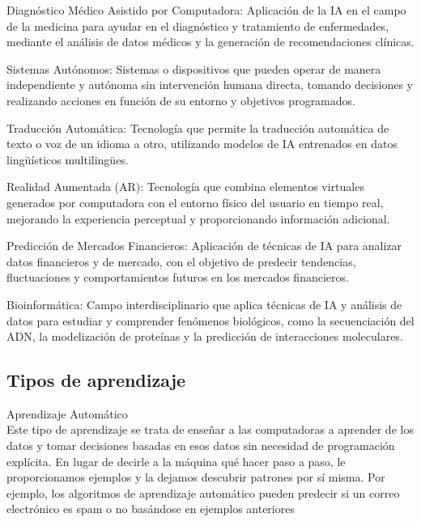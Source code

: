 \begin{myitemize}
    \item Diagnóstico Médico Asistido por Computadora: Aplicación de la IA en el 
    campo de la medicina para ayudar en el diagnóstico y tratamiento de 
    enfermedades, mediante el análisis de datos médicos y la generación de 
    recomendaciones clínicas.
    
    \item Sistemas Autónomos: Sistemas o dispositivos que pueden operar de manera 
    independiente y autónoma sin intervención humana directa, tomando 
    decisiones y realizando acciones en función de su entorno y objetivos programados.
    
    \item Traducción Automática: Tecnología que permite la traducción automática 
    de texto o voz de un idioma a otro, utilizando modelos de IA entrenados en 
    datos lingüísticos multilingües.
    
    \item Realidad Aumentada (AR): Tecnología que combina elementos virtuales 
    generados por computadora con el entorno físico del usuario en tiempo real, 
    mejorando la experiencia perceptual y proporcionando información adicional.
    
    \item Predicción de Mercados Financieros: Aplicación de técnicas de IA para analizar 
    datos financieros y de mercado, con el objetivo de predecir tendencias, 
    fluctuaciones y comportamientos futuros en los mercados financieros.
    
    \item Bioinformática: Campo interdisciplinario que aplica técnicas de IA y 
    análisis de datos para estudiar y comprender fenómenos biológicos, como 
    la secuenciación del ADN, la modelización de proteínas y la predicción de 
    interacciones moleculares.
\end{myitemize}


\subsection{Tipos de aprendizaje}

\noindent \textcolor{Contraste4}{Aprendizaje Automático}\\

Este tipo de aprendizaje se trata de enseñar a las computadoras a aprender de los datos 
y tomar decisiones basadas en esos datos sin necesidad de programación explícita. En 
lugar de decirle a la máquina qué hacer paso a paso, le proporcionamos ejemplos y la 
dejamos descubrir patrones por sí misma. Por ejemplo, los algoritmos de aprendizaje 
automático pueden predecir si un correo electrónico es spam o no basándose en 
ejemplos anteriores\\


